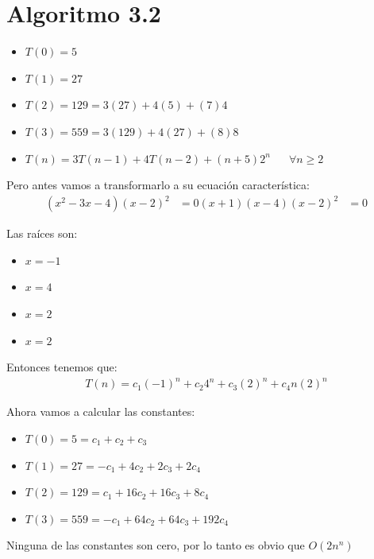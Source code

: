 \documentclass[12pt, fleqn]{article}                            %
\DeclareMathOperator \Space {\quad}                             %
\theoremstyle{break}                                            %
\begin{document}
    \section{Algoritmo 3.2}

        \begin{itemize}
            \item $T(0) = 5$
            \item $T(1) = 27$
            \item $T(2) = 129 = 3(27) + 4(5) + (7)4$
            \item $T(3) = 559 = 3(129) + 4(27) + (8)8$
            \item $T(n) = 3T(n - 1) + 4T(n - 2) + (n + 5)2^n \Space \forall n \geq 2$
        \end{itemize}

        Pero antes vamos a transformarlo a su ecuación característica:
        \begin{align*}
            (x^2 - 3x - 4)(x - 2)^2 &= 0
            (x + 1)(x - 4)(x - 2)^2 &= 0
        \end{align*}

        Las raíces son:
        \begin{itemize}
            \item $x = -1$
            \item $x = 4$
            \item $x = 2$
            \item $x = 2$
        \end{itemize}

        Entonces tenemos que:
        \begin{align*}
            T(n) = c_1(-1)^n + c_2 4^n + c_3(2)^n + c_4 n(2)^n
        \end{align*}

        Ahora vamos a calcular las constantes:
        \begin{itemize}
            \item $T(0) = 5 = c_1 + c_2 + c_3$
            \item $T(1) = 27 = -c_1 + 4c_2 + 2c_3 + 2c_4$
            \item $T(2) = 129 = c_1 + 16c_2 + 16c_3 + 8c_4$
            \item $T(3) = 559 = -c_1 + 64c_2 + 64c_3 + 192c_4$
        \end{itemize}

        Ninguna de las constantes son cero, por lo tanto es obvio que $O(2n^n)$
\end{document}
